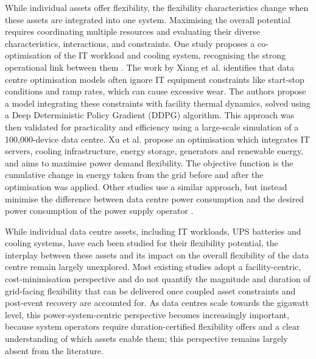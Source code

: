 \documentclass[lettersize,journal]{IEEEtran}
\providecommand{\DIFadd}[1]{{\color{blue}#1}}
\providecommand{\DIFaddbegin}{}
\providecommand{\DIFaddend}{}
\begin{document}
While individual assets offer flexibility, the flexibility characteristics change when these assets are integrated into one system. Maximising the overall potential requires coordinating multiple resources and evaluating their diverse characteristics, interactions, and constraints. One study proposes a co-optimisation of the IT workload and cooling system, recognising the strong operational link between them  \DIFaddbegin \DIFadd{\cite{Fu2020ApEn}}\DIFaddend . The work by  Xiang et al. \cite{xiang2023modeling} identifies that data centre optimisation models often ignore IT equipment constraints like start-stop conditions and ramp rates, which can cause excessive wear. The authors propose a model integrating these constraints with facility thermal dynamics, solved using a Deep Deterministic Policy Gradient (DDPG) algorithm. This approach was then validated for practicality and efficiency using a large-scale simulation of a 100,000-device data centre.
 Xu et al.  \DIFaddbegin \DIFadd{\cite{Xu2023SPIE} }\DIFaddend propose an optimisation which integrates IT servers, cooling infrastructure, energy storage, generators and renewable energy, and aims to maximise power demand flexibility. The objective function is the cumulative change in energy taken from the grid before and after the optimisation was applied. 
Other studies use a similar approach, but instead minimise the difference between  \DIFaddbegin \DIFadd{data centre }\DIFaddend power consumption and the desired power consumption of the power supply operator \cite{cioara2018optimized}. 

 \DIFaddbegin \DIFadd{While individual data centre assets, including IT workloads, UPS batteries and cooling systems, have each been studied for their flexibility potential, the interplay between these assets and its impact on the overall flexibility of the data centre remain largely unexplored. Most existing studies adopt a facility-centric, cost-minimisation perspective and do not quantify the magnitude and duration of grid-facing flexibility that can be delivered once coupled asset constraints and post-event recovery are accounted for. As }\DIFaddend data centres scale  \DIFaddbegin \DIFadd{towards }\DIFaddend the gigawatt level,  \DIFaddbegin \DIFadd{this power-system-centric perspective becomes increasingly important, because system operators require duration-certified flexibility offers and a clear understanding of which assets enable them; this perspective remains largely absent from the literature}\DIFaddend .
\end{document}
